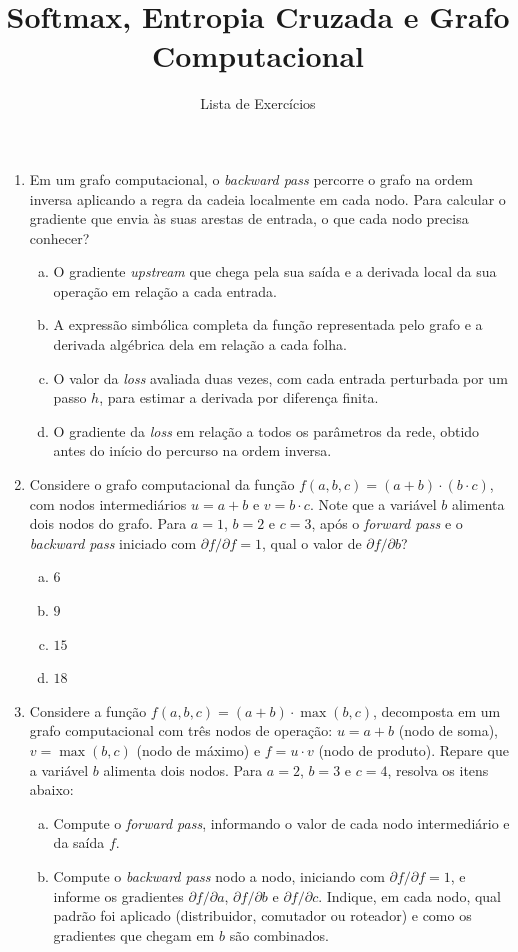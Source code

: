 \documentclass{dlproblemset}
\title{Softmax, Entropia Cruzada e Grafo Computacional}
\subtitle{Lista de Exercícios}
\begin{document}
\begin{enumerate}[1)]

    \item Em um grafo computacional, o \textit{backward pass} percorre o grafo na ordem inversa aplicando a regra da cadeia localmente em cada nodo. Para calcular o gradiente que envia às suas arestas de entrada, o que cada nodo precisa conhecer?
    \begin{enumerate}[(a)]
        \item O gradiente \textit{upstream} que chega pela sua saída e a derivada local da sua operação em relação a cada entrada.
        \item A expressão simbólica completa da função representada pelo grafo e a derivada algébrica dela em relação a cada folha.
        \item O valor da \textit{loss} avaliada duas vezes, com cada entrada perturbada por um passo $h$, para estimar a derivada por diferença finita.
        \item O gradiente da \textit{loss} em relação a todos os parâmetros da rede, obtido antes do início do percurso na ordem inversa.
    \end{enumerate}

    \item Considere o grafo computacional da função $f(a,b,c) = (a + b)\cdot(b \cdot c)$, com nodos intermediários $u = a + b$ e $v = b \cdot c$. Note que a variável $b$ alimenta dois nodos do grafo. Para $a = 1$, $b = 2$ e $c = 3$, após o \textit{forward pass} e o \textit{backward pass} iniciado com $\partial f / \partial f = 1$, qual o valor de $\partial f / \partial b$?
    \begin{enumerate}[(a)]
        \item $6$
        \item $9$
        \item $15$
        \item $18$
    \end{enumerate}

    \item Considere a função $f(a,b,c) = (a + b)\cdot\max(b, c)$, decomposta em um grafo computacional com três nodos de operação: $u = a + b$ (nodo de soma), $v = \max(b, c)$ (nodo de máximo) e $f = u \cdot v$ (nodo de produto). Repare que a variável $b$ alimenta dois nodos. Para $a = 2$, $b = 3$ e $c = 4$, resolva os itens abaixo:
    \begin{enumerate}[a)]
        \item Compute o \textit{forward pass}, informando o valor de cada nodo intermediário e da saída $f$.
        \item Compute o \textit{backward pass} nodo a nodo, iniciando com $\partial f/\partial f = 1$, e informe os gradientes $\partial f/\partial a$, $\partial f/\partial b$ e $\partial f/\partial c$. Indique, em cada nodo, qual padrão foi aplicado (distribuidor, comutador ou roteador) e como os gradientes que chegam em $b$ são combinados.
    \end{enumerate}


\end{enumerate}
\end{document}
